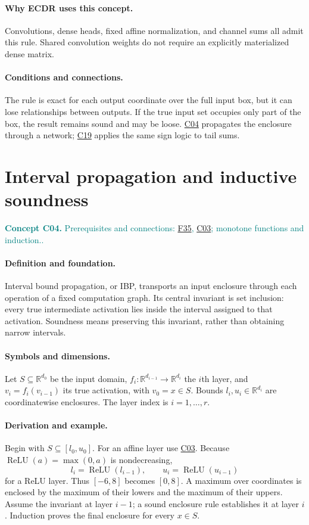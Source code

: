 \documentclass[11pt,a4paper]{article}
\newcommand{\R}{\mathbb R}
\newcommand{\relu}{\operatorname{ReLU}}
\newcommand{\conceptid}{Front matter}
\newcommand{\concept}[3]{\clearpage\renewcommand{\conceptid}{#1}%
\section{#2}\label{concept:#1}%
\textcolor{teal}{\textbf{Concept #1.} Prerequisites and connections: #3.}\par
\typeout{ECDR-CONCEPT-START #1 PAGE=\thepage}}
\begin{document}
\paragraph{Why ECDR uses this concept.}
Convolutions, dense heads, fixed affine normalization, and channel sums all admit this rule. Shared convolution weights do not require an explicitly materialized dense matrix.
\paragraph{Conditions and connections.}
The rule is exact for each output coordinate over the full input box, but it can lose relationships between outputs. If the true input set occupies only part of the box, the result remains sound and may be loose. \hyperref[concept:C04]{C04} propagates the enclosure through a network; \hyperref[concept:C19]{C19} applies the same sign logic to tail sums.
\par\label{endconcept:C03}

\concept{C04}{Interval propagation and inductive soundness}{\hyperref[concept:F35]{F35}, \hyperref[concept:C03]{C03}; monotone functions and induction.}
\paragraph{Definition and foundation.}
Interval bound propagation, or IBP, transports an input enclosure through each operation of a fixed computation graph. Its central invariant is set inclusion: every true intermediate activation lies inside the interval assigned to that activation. Soundness means preserving this invariant, rather than obtaining narrow intervals.
\paragraph{Symbols and dimensions.}
Let $S\subseteq\R^{d_0}$ be the input domain, $f_i:\R^{d_{i-1}}\to\R^{d_i}$ the $i$th layer, and $v_i=f_i(v_{i-1})$ its true activation, with $v_0=x\in S$. Bounds $l_i,u_i\in\R^{d_i}$ are coordinatewise enclosures. The layer index is $i=1,\ldots,r$.
\paragraph{Derivation and example.}
Begin with $S\subseteq[l_0,u_0]$. For an affine layer use \hyperref[concept:C03]{C03}. Because $\relu(a)=\max(0,a)$ is nondecreasing,
\[
 l_i=\relu(l_{i-1}),\qquad u_i=\relu(u_{i-1})
\]
for a ReLU layer. Thus $[-6,8]$ becomes $[0,8]$. A maximum over coordinates is enclosed by the maximum of their lowers and the maximum of their uppers. Assume the invariant at layer $i-1$; a sound enclosure rule establishes it at layer $i$. Induction proves the final enclosure for every $x\in S$.
\end{document}
